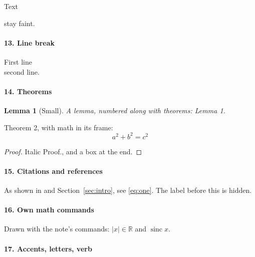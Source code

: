 {Text %
\maketitle \vspace{1em} \label{x} stay faint.

\paragraph{13. Line break}

First line\\
second line.

\paragraph{14. Theorems}

\newtheorem{lem}[theorem]{Lemma}

\begin{lem}[Small]
A lemma, numbered along with theorems: Lemma 1.
\end{lem}

\begin{theorem}
Theorem 2, with math in its frame:
\[ a^2 + b^2 = c^2 \]
\end{theorem}

\begin{proof}
Italic Proof., and a box at the end.
\end{proof}

\paragraph{15. Citations and references}

As shown in \cite{knuth1984, lamport1994} and Section~\ref{sec:intro}, see \eqref{eq:one}. \label{qa:hidden} The label before this is hidden.

\paragraph{16. Own math commands}

\newcommand{\R}{\mathbb{R}}
\newcommand{\abs}[1]{\left\lvert #1 \right\rvert}
\DeclareMathOperator{\sinc}{sinc}
Drawn with the note's commands: $\abs{x} \in \R$ and $\sinc x$.

\paragraph{17. Accents, letters, verb}

}
